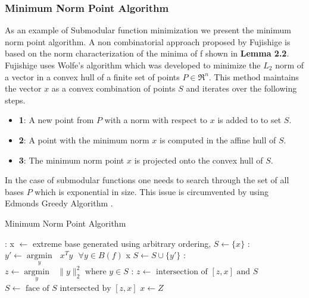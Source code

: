\subsubsection{Minimum Norm Point Algorithm}
As an example of Submodular function minimization we present the minimum norm point algorithm. A non combinatorial approach proposed by Fujishige \cite{Fujishige} is based on the norm characterization of the minima of f shown in {\bf Lemma 2.2}. Fujishige uses Wolfe's algorithm \cite{Wolfe} which was developed to minimize the $L_2$ norm of a vector in a convex hull of a finite set of points $P \in \Re^n$. This method maintains the vector $x$ as a convex combination of points $S$ and iterates over the following steps.\\
\begin{itemize}
 \item {\bf 1}: A new point from $P$ with a norm with respect to $x$ is added to to set $S$.
 \item {\bf 2}: A point with the minimum norm $x$ is computed in the affine hull of $S$.
 \item {\bf 3}: The minimum norm point $x$ is projected onto the convex hull of $S$. 
\end{itemize}

In the case of submodular functions one needs to search through the set of all bases $P$ which is exponential in size. This issue is circumvented by using Edmonds Greedy Algorithm \cite{Edmond}.\\

\begin{algorithm}[htb]
\caption{Minimum Norm Point Algorithm}
\label{alg:min_norm_point}
\begin{algorithmic}[1]
\footnotesize
{}: x $\leftarrow$ extreme base generated using arbitrary ordering, $S \leftarrow \{x\}$
\Loop
  : $y' \leftarrow  \underset{y}{\operatorname{argmin }}\text{ } x^Ty \text{ } \forall y\in B(f)$
 x
\Else
\State $S \leftarrow S \cup \{y'\}$
\EndIf
{}: $z \leftarrow  \underset{y}{\operatorname{argmin }}\text{ } {\|y\|_2^2 \text{ where } y\in S}$
: 
               \State $z \leftarrow \text{ intersection of } [z,x] \text{ and } S$
		\State $S \leftarrow \text{ face of $S$ intersected by } [z,x]$
\EndWhile
\State $x\leftarrow Z$
\EndLoop
\end{algorithmic}
\end{algorithm}